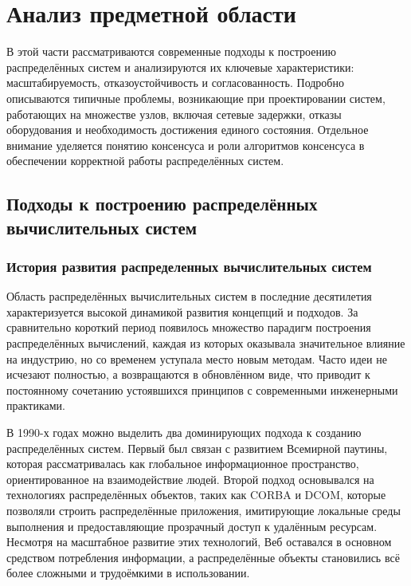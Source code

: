 
\section{Анализ предметной области}

В этой части рассматриваются современные подходы к построению распределённых
систем и анализируются их ключевые характеристики: масштабируемость,
отказоустойчивость и согласованность. Подробно описываются типичные проблемы,
возникающие при проектировании систем, работающих на множестве узлов, включая
сетевые задержки, отказы оборудования и необходимость достижения единого
состояния. Отдельное внимание уделяется понятию консенсуса и роли алгоритмов
консенсуса в обеспечении корректной работы распределённых систем.

\subsection{Подходы к построению распределённых вычислительных систем}

\subsubsection{История развития распределенных вычислительных систем}

Область распределённых вычислительных систем в последние десятилетия
характеризуется высокой динамикой развития концепций и подходов. За
сравнительно короткий период появилось множество парадигм построения
распределённых вычислений, каждая из которых оказывала значительное влияние на
индустрию, но со временем уступала место новым методам. Часто идеи не исчезают
полностью, а возвращаются в обновлённом виде, что приводит к постоянному
сочетанию устоявшихся принципов с современными инженерными практиками.

В 1990-х годах можно выделить два доминирующих подхода к созданию
распределённых систем. Первый был связан с развитием Всемирной паутины, которая
рассматривалась как глобальное информационное пространство, ориентированное на
взаимодействие людей. Второй подход основывался на технологиях распределённых
объектов, таких как CORBA \cite{siegel1998corba} и DCOM\cite{microsoftDCOM},
которые позволяли строить распределённые приложения, имитирующие локальные
среды выполнения и предоставляющие прозрачный доступ к удалённым ресурсам.
Несмотря на масштабное развитие этих технологий, Веб оставался в основном
средством потребления информации, а распределённые объекты становились всё
более сложными и трудоёмкими в использовании.

